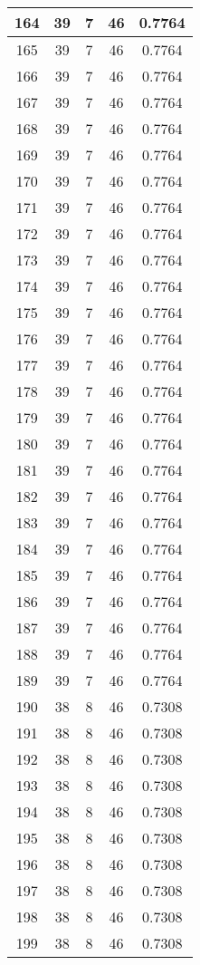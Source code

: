 \documentclass[letterpaper, 12pt]{article}
\begin{document}
\begin{longtable}{|c|c|c|c|c|}
\hline
164 & 39 & 7 & 46 & 0.7764 \\
\hline
165 & 39 & 7 & 46 & 0.7764 \\
\hline
166 & 39 & 7 & 46 & 0.7764 \\
\hline
167 & 39 & 7 & 46 & 0.7764 \\
\hline
168 & 39 & 7 & 46 & 0.7764 \\
\hline
169 & 39 & 7 & 46 & 0.7764 \\
\hline
170 & 39 & 7 & 46 & 0.7764 \\
\hline
171 & 39 & 7 & 46 & 0.7764 \\
\hline
172 & 39 & 7 & 46 & 0.7764 \\
\hline
173 & 39 & 7 & 46 & 0.7764 \\
\hline
174 & 39 & 7 & 46 & 0.7764 \\
\hline
175 & 39 & 7 & 46 & 0.7764 \\
\hline
176 & 39 & 7 & 46 & 0.7764 \\
\hline
177 & 39 & 7 & 46 & 0.7764 \\
\hline
178 & 39 & 7 & 46 & 0.7764 \\
\hline
179 & 39 & 7 & 46 & 0.7764 \\
\hline
180 & 39 & 7 & 46 & 0.7764 \\
\hline
181 & 39 & 7 & 46 & 0.7764 \\
\hline
182 & 39 & 7 & 46 & 0.7764 \\
\hline
183 & 39 & 7 & 46 & 0.7764 \\
\hline
184 & 39 & 7 & 46 & 0.7764 \\
\hline
185 & 39 & 7 & 46 & 0.7764 \\
\hline
186 & 39 & 7 & 46 & 0.7764 \\
\hline
187 & 39 & 7 & 46 & 0.7764 \\
\hline
188 & 39 & 7 & 46 & 0.7764 \\
\hline
189 & 39 & 7 & 46 & 0.7764 \\
\hline
190 & 38 & 8 & 46 & 0.7308 \\
\hline
191 & 38 & 8 & 46 & 0.7308 \\
\hline
192 & 38 & 8 & 46 & 0.7308 \\
\hline
193 & 38 & 8 & 46 & 0.7308 \\
\hline
194 & 38 & 8 & 46 & 0.7308 \\
\hline
195 & 38 & 8 & 46 & 0.7308 \\
\hline
196 & 38 & 8 & 46 & 0.7308 \\
\hline
197 & 38 & 8 & 46 & 0.7308 \\
\hline
198 & 38 & 8 & 46 & 0.7308 \\
\hline
199 & 38 & 8 & 46 & 0.7308 \\
\hline
\end{longtable}
\end{document}
